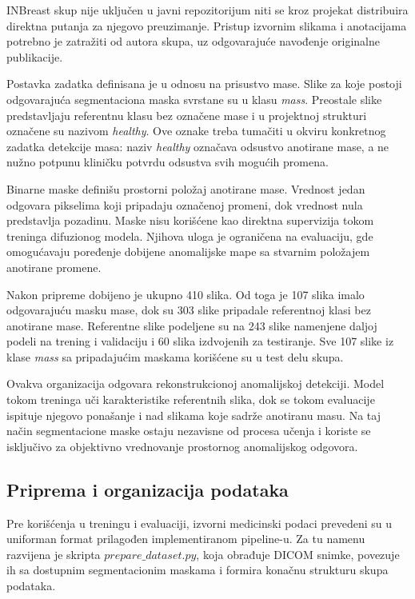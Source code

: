 \documentclass[10pt]{article}
\begin{document}
	INBreast skup nije uključen u javni repozitorijum niti se kroz projekat distribuira direktna putanja za njegovo preuzimanje. Pristup izvornim slikama i anotacijama potrebno je zatražiti od autora skupa, uz odgovarajuće navođenje originalne publikacije.
	
	Postavka zadatka definisana je u odnosu na prisustvo mase. Slike za koje postoji odgovarajuća segmentaciona maska svrstane su u klasu \textit{mass}. Preostale slike predstavljaju referentnu klasu bez označene mase i u projektnoj strukturi označene su nazivom \textit{healthy}. Ove oznake treba tumačiti u okviru konkretnog zadatka detekcije masa: naziv \textit{healthy} označava odsustvo anotirane mase, a ne nužno potpunu kliničku potvrdu odsustva svih mogućih promena.
	
	Binarne maske definišu prostorni položaj anotirane mase. Vrednost jedan odgovara pikselima koji pripadaju označenoj promeni, dok vrednost nula predstavlja pozadinu. Maske nisu korišćene kao direktna supervizija tokom treninga difuzionog modela. Njihova uloga je ograničena na evaluaciju, gde omogućavaju poređenje dobijene anomalijske mape sa stvarnim položajem anotirane promene.
	
	Nakon pripreme dobijeno je ukupno 410 slika. Od toga je 107 slika imalo odgovarajuću masku mase, dok su 303 slike pripadale referentnoj klasi bez anotirane mase. Referentne slike podeljene su na 243 slike namenjene daljoj podeli na trening i validaciju i 60 slika izdvojenih za testiranje. Sve 107 slike iz klase \textit{mass} sa pripadajućim maskama korišćene su u test delu skupa.
	
	Ovakva organizacija odgovara rekonstrukcionoj anomalijskoj detekciji. Model tokom treninga uči karakteristike referentnih slika, dok se tokom evaluacije ispituje njegovo ponašanje i nad slikama koje sadrže anotiranu masu. Na taj način segmentacione maske ostaju nezavisne od procesa učenja i koriste se isključivo za objektivno vrednovanje prostornog anomalijskog odgovora.
	
	\subsection{Priprema i organizacija podataka}
	
	Pre korišćenja u treningu i evaluaciji, izvorni medicinski podaci prevedeni su u uniforman format prilagođen implementiranom pipeline-u. Za tu namenu razvijena je skripta \texttt{$prepare\_dataset.py$}, koja obrađuje DICOM snimke, povezuje ih sa dostupnim segmentacionim maskama i formira konačnu strukturu skupa podataka.
	
\end{document}
